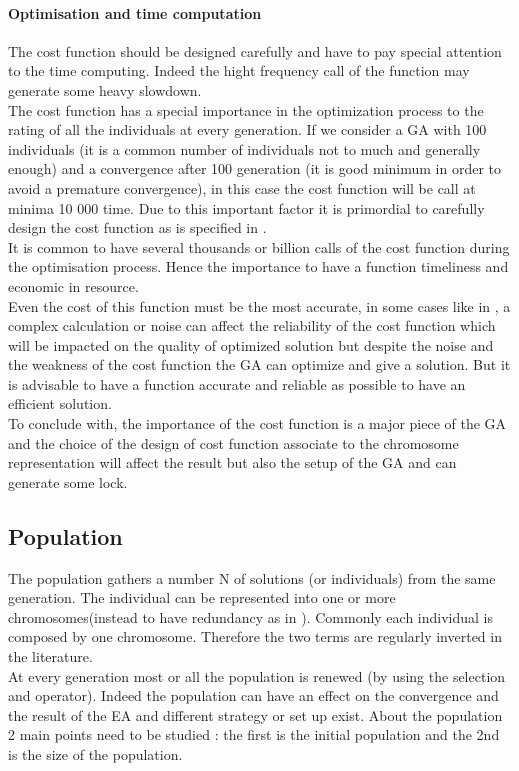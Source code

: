 \paragraph*{Optimisation and time computation}
The cost function should be designed carefully and have to pay special attention to the time computing. Indeed the hight frequency call of the function may generate some heavy slowdown. \\
The cost function has a special importance in the optimization process to  the rating of all the individuals at every generation. If we consider a GA with 100 individuals (it is a common number of individuals  not to much and  generally enough) and a convergence after 100 generation (it is good minimum in order to avoid a premature convergence), in this case the cost function will be call at minima 10 000 time. Due  to this important factor it is primordial to carefully design the cost function as is specified in \cite{70*arabas1994}.\\
It is common to have several thousands or billion calls of the cost function during the optimisation process.
  Hence the importance to have a function timeliness and economic in resource. \\
Even the cost of this function must be the most accurate, in some cases like in \cite{95*miller1995}, a complex calculation or noise can affect the reliability of the cost function which will be impacted on the quality of optimized solution but despite the noise and the weakness of the cost function the GA can optimize and give a solution. But it is advisable to have a function accurate and reliable as possible to have an efficient solution.\\
 To conclude with, the importance of the cost function is a major piece of the GA and the choice of the design of cost function associate to the chromosome representation will affect the result but also the setup of the GA and can generate some lock. \\

	
\subsection{Population }\label{sec:Population}
The population gathers a number N of solutions (or individuals) from the same generation. The individual can be represented into one or  more chromosomes(instead to have redundancy as in \cite{ 121*ronald1997}). Commonly each individual is composed by one chromosome. Therefore the two terms are regularly inverted in the literature.\\
At every generation most or all the population is renewed (by using the selection and operator). Indeed the population can have an effect on the convergence and the result of the EA and different strategy or set up exist. About the population 2 main points need to be studied : the first is the initial population and the 2nd is the size of the population.  

